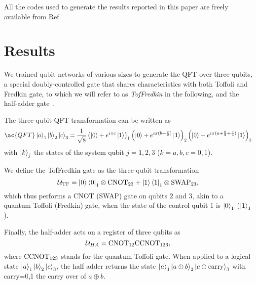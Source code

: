 All the codes used to generate the results reported in this paper are freely available from Ref.~\cite{lucaarchivio}



\section{Results}
\label{results}
We trained qubit networks of various sizes to generate the \acf{QFT} over three qubits, a special doubly-controlled gate that shares characteristics with both Toffoli and Fredkin gate, to which we will refer to as \emph{TofFredkin} in the following, and the half-adder gate~\cite{barbosa2006quantum}.

The three-qubit \ac{QFT} transformation can be written as
\begin{equation}
\ac{QFT}\ket{a}_1\ket{b}_2\ket{c}_3=\frac{1}{\sqrt 8}\left(\ket0+e^{i\pi c}\ket1\right)_1\left(\ket0+e^{i\pi (b+\frac{c}{2})}\ket1\right)_2\left(\ket0+e^{i\pi (a+\frac{b}{2}+\frac{c}{4})}\ket1\right)_3
\end{equation}
with $\ket{k}_j$ the states of the system qubit $j=1,2,3$ ($k=a,b,c=0,1$).

We define the TofFredkin gate as the three-qubit transformation
\begin{equation}
{\mathcal{U}}_{\rm TF}=\ket{0}\bra{0}_1\otimes{\rm CNOT}_{23}+\ket{1}\bra{1}_1\otimes{\rm SWAP}_{23},
\end{equation}
which thus performs a CNOT (SWAP) gate on qubits $2$ and $3$, akin to a quantum Toffoli (Fredkin) gate, when the state of the control qubit 1 is $\ket{0}_1$ ($\ket{1}_1$).

Finally, the half-adder acts on a register of three qubits as
\begin{equation}
{{\mathcal{U}}}_{HA}={\rm CNOT}_{12}{\rm CCNOT}_{123},
\end{equation}
where ${\rm CCNOT}_{123}$ stands for the quantum Toffoli gate. When applied to a logical state $\ket{a}_1\ket b_2\ket c_3$, the half adder returns the state $\ket a_1\ket{a\oplus b}_2\ket{c\oplus{\rm carry}}_3$ with carry=0,1 the carry over of $a\oplus b$.

